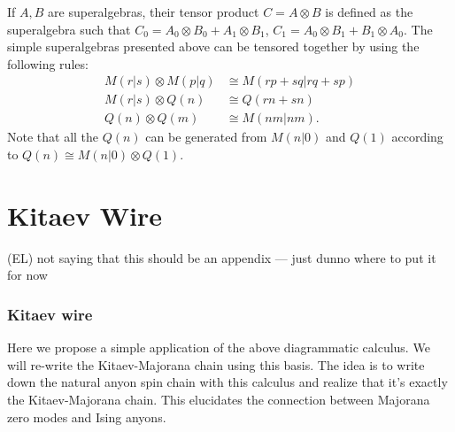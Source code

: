 \documentclass[12pt,a4paper]{article}
\newcounter{arrow}
\newcommand{\tp}{\otimes}
\newcommand{\ra}{\rightarrow}
\newcommand\be            {\begin{equation}}
\newcommand\ee            {\end{equation}}
\newcommand{\End}{\text{End}}
\newcommand{\dave}[1]{{\color{ao(english)}\footnotesize{(DA) #1}}}
\newcommand{\ethan}[1]{{\color{amethyst}\footnotesize{(EL) #1}}}
\begin{document}
If $A,B$ are superalgebras, their tensor product $C=A\tp B$ is defined as the superalgebra such that $C_0 = A_0\tp B_0 + A_1\tp B_1$, $C_1 = A_0\tp B_1 + B_1\tp A_0$. 
The simple superalgebras presented above can be tensored together by using the following rules:
\be \begin{aligned} M(r|s) \tp M(p|q) & \cong M(rp+sq|rq+sp) \\ 
M(r|s) \tp Q(n) & \cong Q(rn+sn) \\ 
Q(n) \tp Q(m) & \cong M(nm | nm). \end{aligned}
\ee
Note that all the $Q(n)$ can be generated from $M(n|0)$ and $Q(1)$ according to $Q(n) \cong M(n|0)\tp Q(1)$. 






\section{Kitaev Wire}

\ethan{not saying that this should be an appendix --- just dunno where to put it for now}
\subsubsection{Kitaev wire}
Here we propose a simple application of the above diagrammatic calculus. 
We will re-write the Kitaev-Majorana chain using this basis. 
The idea is to write down the natural anyon spin chain with this calculus and realize that it's exactly the Kitaev-Majorana chain. 
This elucidates the connection between Majorana zero modes and Ising anyons. 
\end{document}
